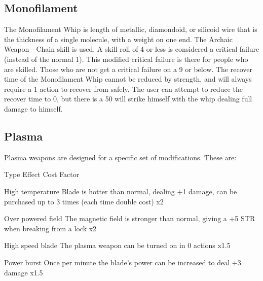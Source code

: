 \documentclass[twoside]{book}
\begin{document}
\subsection{Monofilament}
      The Monofilament Whip is length of metallic,
               diamondoid, or silicoid wire that is the thickness of a
               single molecule, with a weight on one end. The Archaic
               Weapon—Chain skill is used. A skill roll of 4 or
               less is considered a critical failure (instead of the
               normal 1). This modified critical failure is there for
               people who are skilled. Those who are not get a critical
               failure on a 9 or below.   The recover time of the Monofilament Whip cannot be
               reduced by strength, and will always require a 1 action to
               recover from safely. The user can attempt to reduce the
               recover time to 0, but there is a 50%
               will strike himself with the whip dealing full damage to
               himself. 
\subsection{Plasma}
      Plasma weapons are designed for a specific set of
               modifications. These are:   
                
                  
                   Type 
                   Effect 
                   Cost Factor   
                  
                  
                   High temperature   
                     Blade is hotter than normal, dealing +1
                     damage, can be purchased up to 3 times (each time
                     double cost) 
                   x2   
                  
                  
                   Over powered field   
                     The magnetic field is stronger than normal,
                     giving a +5 STR when breaking from a lock 
                   x2   
                  
                  
                   High speed blade   
                     The plasma weapon can be turned on in 0
                     actions 
                   x1.5   
                  
                  
                   Power burst   
                     Once per minute the blade’s power can be
                     increased to deal +3 damage 
                   x1.5   
                  
\end{document}
